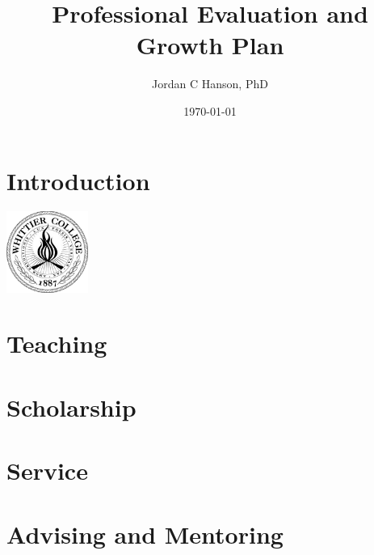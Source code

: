 \documentclass[10pt]{book}
\title{Professional Evaluation and Growth Plan}
\author{Jordan C Hanson, PhD}
\date{\today}
\begin{document}
\maketitle
\tableofcontents

\chapter{Introduction}
\centering
\includegraphics[width=0.2\textwidth]{figures/WhittierCollegeSeal.png}
\begin{flushleft}

\end{flushleft}

\chapter{Teaching}
\begin{flushleft}

\end{flushleft}

\chapter{Scholarship}
\begin{flushleft}

\end{flushleft}

\chapter{Service}
\begin{flushleft}

\end{flushleft}

\chapter{Advising and Mentoring}
\begin{flushleft}

\end{flushleft}



 
\end{document}
